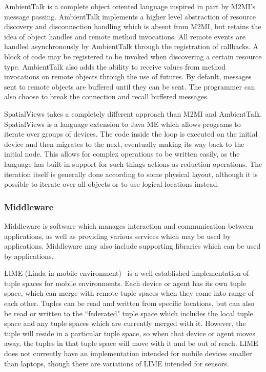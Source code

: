 AmbientTalk is a complete object oriented language inspired in part by M2MI's message passing. AmbientTalk implements a higher level abstraction of resource discovery and disconnection handling which is absent from M2MI, but retains the idea of object handles and remote method invocations. All remote events are handled asynchronously by AmbientTalk through the registration of callbacks. A block of code may be registered to be invoked when discovering a certain resource type. AmbientTalk also adds the ability to receive values from method invocations on remote objects through the use of futures. By default, messages sent to remote objects are buffered until they can be sent. The programmer can also choose to break the connection and recall buffered messages.

SpatialViews takes a completely different approach than M2MI and AmbientTalk. SpatialViews is a language extension to Java ME which allows programs to iterate over groups of devices. The code inside the loop is executed on the initial device and then migrates to the next, eventually making its way back to the initial node. This allows for complex operations to be written easily, as the language has built-in support for such things actions as reduction operations. The iteration itself is generally done according to some physical layout, although it is possible to iterate over all objects or to use logical locations instead.

\subsubsection{Middleware}

Middleware is software which manages interaction and communication between applications, as well as providing various services which may be used by applications. Middleware may also include supporting libraries which can be used by applications.

LIME (Linda in mobile environment)~\cite{lime} is a well-established implementation of tuple spaces\cite{linda} for mobile environments. Each device or agent has its own tuple space, which can merge with remote tuple spaces when they come into range of each other. Tuples can be read and written from specific locations, but can also be read or written to the ``federated" tuple space which includes the local tuple space and any tuple spaces which are currently merged with it. However, the tuple will reside in a particular tuple space, so when that device or agent moves away, the tuples in that tuple space will move with it and be out of reach. LIME does not currently have an implementation intended for mobile devices smaller than laptops, though there are variations of LIME intended for sensors.

